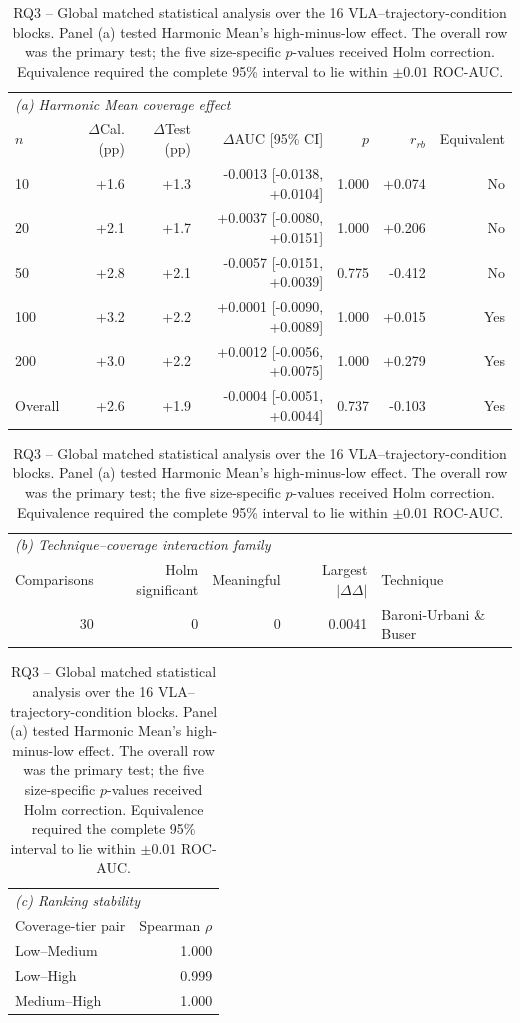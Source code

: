 \begin{table}[t]
\centering
\caption{RQ3 -- Global matched statistical analysis over the 16 VLA--trajectory-condition blocks. Panel (a) tested Harmonic Mean's high-minus-low effect. The overall row was the primary test; the five size-specific $p$-values received Holm correction. Equivalence required the complete 95\% interval to lie within $\pm0.01$ ROC-AUC.}
\label{tab:rq3-global-statistics}
{\scriptsize
\setlength{\tabcolsep}{4pt}
\begin{tabular}{lrrrrrr}
\toprule
\multicolumn{7}{l}{\textit{(a) Harmonic Mean coverage effect}} \\
$n$ & $\Delta$Cal. (pp) & $\Delta$Test (pp) & $\Delta$AUC [95\% CI] & $p$ & $r_{rb}$ & Equivalent \\
\midrule
10 & +1.6 & +1.3 & -0.0013 [-0.0138, +0.0104] & 1.000 & +0.074 & No \\
20 & +2.1 & +1.7 & +0.0037 [-0.0080, +0.0151] & 1.000 & +0.206 & No \\
50 & +2.8 & +2.1 & -0.0057 [-0.0151, +0.0039] & 0.775 & -0.412 & No \\
100 & +3.2 & +2.2 & +0.0001 [-0.0090, +0.0089] & 1.000 & +0.015 & Yes \\
200 & +3.0 & +2.2 & +0.0012 [-0.0056, +0.0075] & 1.000 & +0.279 & Yes \\
Overall & +2.6 & +1.9 & -0.0004 [-0.0051, +0.0044] & 0.737 & -0.103 & Yes \\
\bottomrule
\end{tabular}

\vspace{2mm}
\begin{tabular}{rrrrl}
\toprule
\multicolumn{5}{l}{\textit{(b) Technique--coverage interaction family}} \\
Comparisons & Holm significant & Meaningful & Largest $|\Delta\Delta|$ & Technique \\
\midrule
30 & 0 & 0 & 0.0041 & Baroni-Urbani \& Buser \\
\bottomrule
\end{tabular}

\vspace{2mm}
\begin{tabular}{lr}
\toprule
\multicolumn{2}{l}{\textit{(c) Ranking stability}} \\
Coverage-tier pair & Spearman $\rho$ \\
\midrule
Low--Medium & 1.000 \\
Low--High & 0.999 \\
Medium--High & 1.000 \\
\bottomrule
\end{tabular}
}
\end{table}
